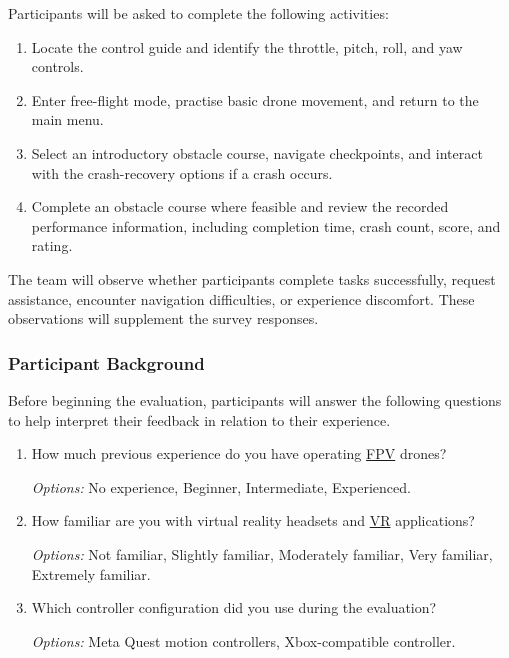 \documentclass[12pt, titlepage]{article}
\begin{document}
Participants will be asked to complete the following activities:

\begin{enumerate}
    \item Locate the control guide and identify the throttle, pitch, roll, and yaw controls.

    \item Enter free-flight mode, practise basic drone movement, and return to the main menu.

    \item Select an introductory obstacle course, navigate checkpoints, and interact with the crash-recovery options if a crash occurs.

    \item Complete an obstacle course where feasible and review the recorded performance information, including completion time, crash count, score, and rating.
\end{enumerate}

The team will observe whether participants complete tasks successfully, request assistance, encounter navigation difficulties, or experience discomfort. These observations will supplement the survey responses.

\subsubsection{Participant Background}

Before beginning the evaluation, participants will answer the following questions to help interpret their feedback in relation to their experience.

\begin{enumerate}
    \item[\textbf{Q1.}] How much previous experience do you have operating \hyperlink{abbr:FPV}{FPV} drones?

    \textit{Options:} No experience, Beginner, Intermediate, Experienced.

    \item[\textbf{Q2.}] How familiar are you with virtual reality headsets and \hyperlink{abbr:VR}{VR} applications?

    \textit{Options:} Not familiar, Slightly familiar, Moderately familiar, Very familiar, Extremely familiar.

    \item[\textbf{Q3.}] Which controller configuration did you use during the evaluation?

    \textit{Options:} Meta Quest motion controllers, Xbox-compatible controller.
\end{enumerate}
\end{document}
